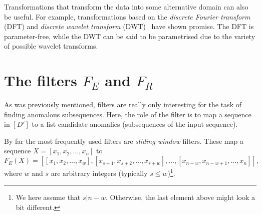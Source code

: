 


Transformations that transform the data into some alternative domain can also be useful. For example, transformations based on the \emph{discrete Fourier transform} (DFT) and \emph{discrete wavelet transform} (DWT)~\cite{fu} have shown promise. The DFT is parameter-free, while the DWT can be said to be parametrised due to the variety of possible wavelet transforms.

\section{The filters \texorpdfstring{$F_E$}{FE} and \texorpdfstring{$F_R$}{FR}}
\label{sect:filters}

As was previously mentioned, filters are really only interesting for the task of finding anomalous subsequences. Here, the role of the filter is to map a sequence in $[D']$ to a list candidate anomalies (subsequences of the input sequence).

By far the most frequently used filters are \emph{sliding window} filters. These map a sequence $X = [x_1, x_2, \dots, x_n]$ to
\[
    F_E(X) = [[x_1, x_2, \dots, x_w], [x_{s + 1}, x_{s + 2}, \dots, x_{s + w}], \dots, [x_{n - w}, x_{n - w + 1}, \dots, x_n]],
\]
where $w$ and $s$ are arbitrary integers (typically $s \leq w$)\footnote{We here assume that $s | n - w$. Otherwise, the last element above might look a bit different.}.

